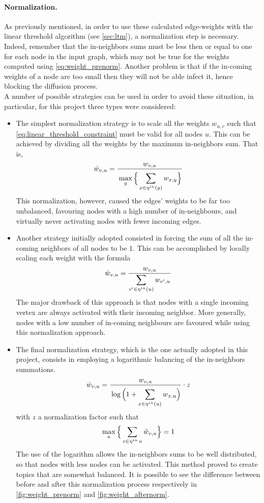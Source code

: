\paragraph{\textbf{Normalization.}}
As previously mentioned, in order to use these calculated edge-weights with the linear threshold algorithm (see \cref{sec:ltm}), a normalization step is necessary. 
 Indeed, remember that the in-neighbors sums must be less then or equal to one for each node in the input graph, which may not be true for the weights computed using \cref{eq:weight_prenorm}. Another problem is that if the in-coming weights of a node are too small then they will not be able infect it, hence blocking the diffusion process.\\ 
 A number of possible strategies can be used in order to avoid these situation, in particular, for this project three types were considered:
 \begin{itemize}
     \item The simplest normalization strategy is to scale all the weights $w_{u,v}$ such that  \cref{eq:linear_threshold_constraint} must be valid for all nodes $u$. This can be achieved by dividing all the weights by the maximum in-neighbors sum. That is,
     \[\hat w_{v,u} = \frac{w_{v,u}}{\displaystyle \vphantom{\bigg(} \max_{y} \Big\{\sum_{x\in \mathop{\eta^{in}}(y)} w_{x,y}\Big\}}\]
     This normalization, however, caused the edges' weights to be far too unbalanced, favouring nodes with a high number of in-neighbours, and virtually never activating nodes with fewer incoming edges.
     \item Another strategy initially adopted consisted in forcing the sum of all the in-coming neighbors of all nodes to be $1$. This can be accomplished by locally scaling each weight with the formula
     \[
     \hat w_{v,u} =\frac{w_{v,u}}{\displaystyle \sum_{v'\in \mathop{\eta^{in}}(u)}w_{v',u}}
     \]
     The major drawback of this approach is that nodes with a single incoming vertex  are always activated with their incoming neighbor. More generally, nodes with a low number of in-coming neighbours are favoured while using this normalization approach.
     \item The final normalization strategy, which is the one actually adopted in this project, consists in employing a logarithmic balancing of the in-neighbors summations.
     \[
     \hat w_{v,u} = \frac{w_{v,u}}{\vphantom{\bigg(} \displaystyle \log\Big( 1 + \sum_{x\in \mathop{\eta^{in}}(u)}w_{x,u}\Big)}\cdot z
     \]
     with $z$ a normalization factor such that 
     \[\max_{u}\Big\{ \sum_{v\in \mathop{\eta^{in}}{u}}\hat w_{v,u} \Big\} = 1\]
     The use of the logarithm allows the in-neighbors sums to be well distributed, so that nodes with less nodes can be activated. This method proved to create topics that are somewhat balanced. It is possible to see the difference between before and after this normalization process respectively in \cref{fig:weight_prenorm} and \cref{fig:weight_afternorm}.
 \end{itemize}
 
